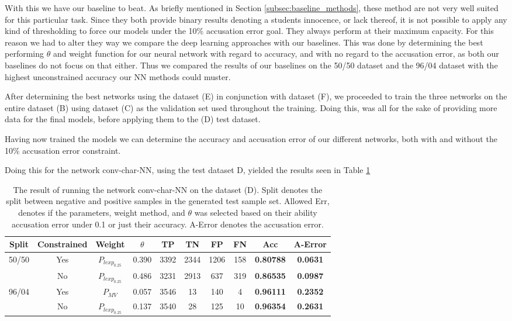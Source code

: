 With this we have our baseline to beat. As briefly mentioned in Section
\ref{subsec:baseline_methods}, these method are not very well suited for this
particular task. Since they both provide binary results denoting a students
innocence, or lack thereof, it is not possible to apply any kind of thresholding
to force our models under the 10\% accusation error goal. They always perform at
their maximum capacity. For this reason we had to alter they way we compare the
deep learning approaches with our baselines. This was done by determining the
best performing $\theta$ and weight function for our neural network with regard
to accuracy, and with no regard to the accusation error, as both our baselines
do not focus on that either. Thus we compared the results of our baselines on
the 50/50 dataset and the 96/04 dataset with the highest unconstrained accuracy
our \gls{NN} methods could muster.

After determining the best networks using the dataset (E) in conjunction with
dataset (F), we proceeded to train the three networks on the entire dataset (B)
using dataset (C) as the validation set used throughout the training. Doing
this, was all for the sake of providing more data for the final models, before
applying them to the (D) test dataset.

Having now trained the models we can determine the accuracy and accusation
error of our different networks, both with and without the 10\% accusation error
constraint.

Doing this for the network \gls{conv-char-NN}, using the test dataset D, yielded
the results seen in Table \ref{tab:char_CNN_res}

\begin{table}[]
\begin{tabular}{|c|c|c|c|c|c|c|c||c|c|}
\hline
Split & Constrained & Weight & $\theta$ & TP & TN & FP & FN & \textbf{Acc} & \textbf{A-Error} \\ \hline
\multirow{2}{*}{50/50} & Yes & $P_{lexp_{0.25}}$ & 0.390 & 3392 & 2344 & 1206 & 158 & \textbf{0.80788} & \textbf{0.0631} \\ \cline{2-10} 
 & No & $P_{lexp_{0.25}}$ & 0.486 & 3231 & 2913 & 637 & 319 & \textbf{0.86535} & \textbf{0.0987} \\ \hline
\multirow{2}{*}{96/04} & Yes & $P_{MV}$ & 0.057 & 3546 & 13 & 140 & 4 & \textbf{0.96111} & \textbf{0.2352} \\ \cline{2-10} 
 & No & $P_{lexp_{0.25}}$ & 0.137 & 3540 & 28 & 125 & 10 & \textbf{0.96354} & \textbf{0.2631} \\ \hline
\end{tabular}
\caption{The result of running the network \gls{conv-char-NN} on the dataset
(D). Split denotes the split between negative and positive samples in the
generated test sample set. Allowed Err, denotes if the parameters, weight
method, and $\theta$ was selected based on their ability accusation error under
0.1 or just their accuracy. A-Error denotes the accusation error.}
\label{tab:char_CNN_res}
\end{table}

